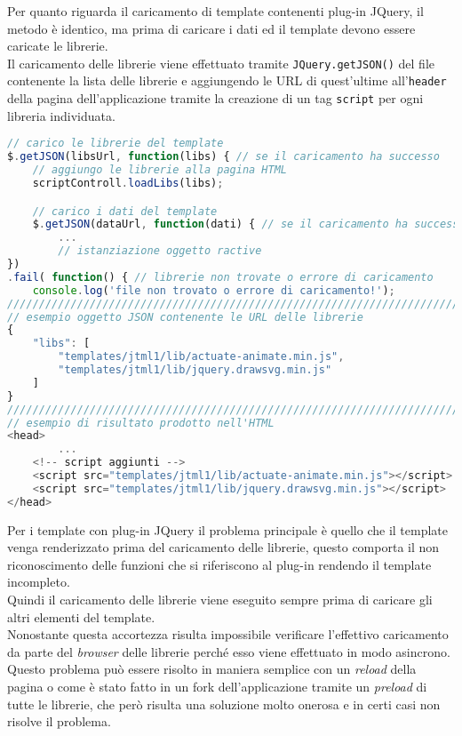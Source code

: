 Per quanto riguarda il caricamento di template contenenti plug-in JQuery, il metodo è identico, ma prima di caricare i dati ed il template devono essere caricate le librerie.\\
Il caricamento delle librerie viene effettuato tramite \texttt{JQuery.getJSON()} del file contenente la lista delle librerie e aggiungendo le URL di quest'ultime all'\texttt{header} della pagina dell'applicazione tramite la creazione di un tag \texttt{script} per ogni libreria individuata.\\
\begin{lstlisting}[language=JavaScript, caption=Codice per l'aggiunta delle librerie più esempio di JSON e risultato ottenuto.]
// carico le librerie del template
$.getJSON(libsUrl, function(libs) { // se il caricamento ha successo
	// aggiungo le librerie alla pagina HTML
	scriptControll.loadLibs(libs);

	// carico i dati del template
	$.getJSON(dataUrl, function(dati) { // se il caricamento ha successo
		...
		// istanziazione oggetto ractive
})
.fail( function() { // librerie non trovate o errore di caricamento
	console.log('file non trovato o errore di caricamento!');
///////////////////////////////////////////////////////////////////////
// esempio oggetto JSON contenente le URL delle librerie
{
	"libs": [
		"templates/jtml1/lib/actuate-animate.min.js",
		"templates/jtml1/lib/jquery.drawsvg.min.js"
	]
}
///////////////////////////////////////////////////////////////////////
// esempio di risultato prodotto nell'HTML
<head>
		...
	<!-- script aggiunti -->
	<script src="templates/jtml1/lib/actuate-animate.min.js"></script>
	<script src="templates/jtml1/lib/jquery.drawsvg.min.js"></script>
</head>

\end{lstlisting}
Per i template con plug-in JQuery il problema principale è quello che il template venga renderizzato prima del caricamento delle librerie, questo comporta il non riconoscimento delle funzioni che si riferiscono al plug-in rendendo il template incompleto.\\
Quindi il caricamento delle librerie viene eseguito sempre prima di caricare gli altri elementi del template.\\
Nonostante questa accortezza risulta impossibile verificare l'effettivo caricamento da parte del \textit{browser} delle librerie perché esso viene effettuato in modo asincrono.\\
Questo problema può essere risolto in maniera semplice con un \textit{reload} della pagina o come è stato fatto in un fork dell'applicazione tramite un \textit{preload} di tutte le librerie, che però risulta una soluzione molto onerosa e in certi casi non risolve il problema.

